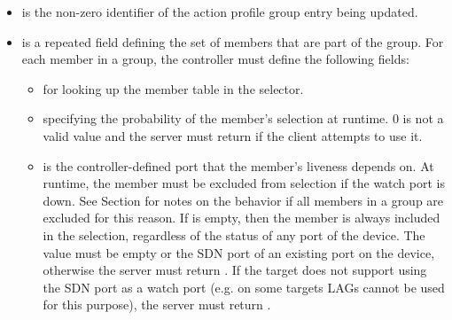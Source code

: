 \documentclass[11pt]{article}
\begin{document}
{\begin{itemize}
\item{}
 is the non-zero  identifier of the action profile group
entry being updated.%

\item{}
 is a repeated field defining the set of members that are part of the
group. For each member in a group, the controller must define the following
fields:%

\begin{itemize}[noitemsep,topsep=\mdcompacttopsep]%

\item{} for looking up the member table in the selector.%

\item{} specifying the probability of the member's selection at
runtime. 0 is not a valid  value and the server must return
 if the client attempts to use it.%

\item{} is the controller-defined port that the member's
liveness depends on. At runtime, the member must be excluded from
selection if the watch port is down.  See Section
 for notes on the behavior if all members in
a group are excluded for this reason. If  is empty, then the
member is always included in the selection, regardless of the status of
any port of the device.  The value must be empty or the SDN port of an
existing port on the device, otherwise the server must return
. If the target does not support using the SDN port as a
watch port (e.g. on some targets LAGs cannot be used for this purpose),
the server must return .%
\end{itemize}%


\end{itemize}}
\end{document}
